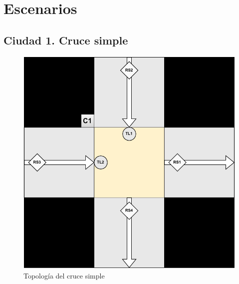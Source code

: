 \chapter{Escenarios}
    \label{chap:six}
    
\section{Ciudad 1. Cruce simple}
\begin{figure}[H]
    \centering
    \includegraphics[width=1\linewidth]{text/image/DCruc-CSimple-Topologia.pdf}
    \caption{Topología del cruce simple}
    \label{fig:cruce_simple_topologia_esc}
\end{figure}

\newpage
